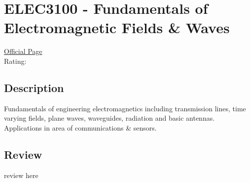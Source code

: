 \hypertarget{ELEC3100}{\section{ELEC3100 - Fundamentals of Electromagnetic Fields \& Waves}}

\large
\textcolor{turbo_purple}{\href{https://my.uq.edu.au/programs-courses/course.html?course_code=ELEC3100}{Official Page}} \\
Rating: \cstar\cstar\cstar\cstar\ostar

\normalsize
\subsection*{Description}
Fundamentals of engineering electromagnetics including transmission lines, time varying fields, plane waves, waveguides, radiation and basic antennas.
Applications in area of communications \& sensors.

\subsection*{Review}
review here

